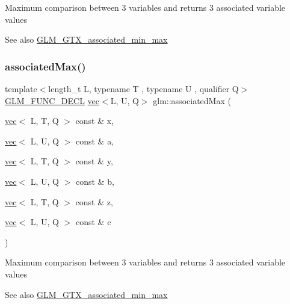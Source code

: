 Maximum comparison between 3 variables and returns 3 associated variable values \begin{DoxySeeAlso}{See also}
\mbox{\hyperlink{group__gtx__associated__min__max}{G\+L\+M\+\_\+\+G\+T\+X\+\_\+associated\+\_\+min\+\_\+max}} 
\end{DoxySeeAlso}
\mbox{\label{group__gtx__associated__min__max_gab84fdc35016a31e8cd0cbb8296bddf7c}} 
\subsubsection{\texorpdfstring{associated\+Max()}{associatedMax()}\hspace{0.1cm}{\footnotesize\ttfamily [6/12]}}
{\footnotesize\ttfamily template$<$length\+\_\+t L, typename T , typename U , qualifier Q$>$ \\
\mbox{\hyperlink{setup_8hpp_ab2d052de21a70539923e9bcbf6e83a51}{G\+L\+M\+\_\+\+F\+U\+N\+C\+\_\+\+D\+E\+CL}} \mbox{\hyperlink{structglm_1_1vec}{vec}}$<$L, U, Q$>$ glm\+::associated\+Max (\begin{DoxyParamCaption}\item[{\mbox{\hyperlink{structglm_1_1vec}{vec}}$<$ L, T, Q $>$ const \&}]{x,  }\item[{\mbox{\hyperlink{structglm_1_1vec}{vec}}$<$ L, U, Q $>$ const \&}]{a,  }\item[{\mbox{\hyperlink{structglm_1_1vec}{vec}}$<$ L, T, Q $>$ const \&}]{y,  }\item[{\mbox{\hyperlink{structglm_1_1vec}{vec}}$<$ L, U, Q $>$ const \&}]{b,  }\item[{\mbox{\hyperlink{structglm_1_1vec}{vec}}$<$ L, T, Q $>$ const \&}]{z,  }\item[{\mbox{\hyperlink{structglm_1_1vec}{vec}}$<$ L, U, Q $>$ const \&}]{c }\end{DoxyParamCaption})}

Maximum comparison between 3 variables and returns 3 associated variable values \begin{DoxySeeAlso}{See also}
\mbox{\hyperlink{group__gtx__associated__min__max}{G\+L\+M\+\_\+\+G\+T\+X\+\_\+associated\+\_\+min\+\_\+max}} 
\end{DoxySeeAlso}
\mbox{\label{group__gtx__associated__min__max_gadd2a2002f4f2144bbc39eb2336dd2fba}} 
